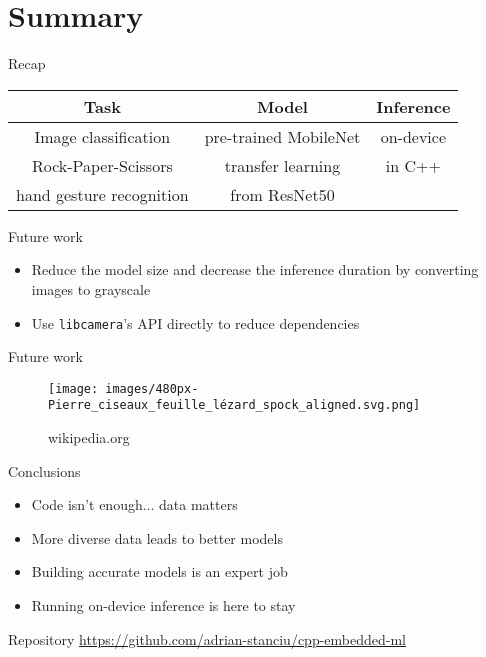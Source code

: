 
\section{Summary}

\begin{frame}{Recap}
  \begin{table}
	\begin{tabular}{|c|c|c|}
	  \hline
		\textbf{Task} & \textbf{Model} & \textbf{Inference} \\
	  \hline
		\multicolumn{1}{|c|}{Image classification} &
		pre-trained MobileNet & on-device \\
	  \cline{1-2}
		\multicolumn{1}{|c|}{Rock-Paper-Scissors} & transfer learning & in C++ \\
		\multicolumn{1}{|c|}{hand gesture recognition} & from ResNet50 & \\
	  \hline
	\end{tabular}
  \end{table}
\end{frame}

\begin{frame}{Future work}
  \begin{itemize}
	\item Reduce the model size and decrease the inference duration by
	converting images to grayscale
	\item Use \texttt{libcamera}'s API directly to reduce dependencies
  \end{itemize}
\end{frame}

\begin{frame}{Future work}
  \begin{figure}
	\texttt{[image: images/480px-Pierre\_ciseaux\_feuille\_lézard\_spock\_aligned.svg.png]}
	\caption{wikipedia.org}
  \end{figure}
\end{frame}

\begin{frame}{Conclusions}
  \begin{itemize}
	\item Code isn't enough... data matters
	\item More diverse data leads to better models
	\item Building accurate models is an expert job
	\item Running on-device inference is here to stay
  \end{itemize}
\end{frame}

\begin{frame}{Repository}
  \url{https://github.com/adrian-stanciu/cpp-embedded-ml}
\end{frame}

